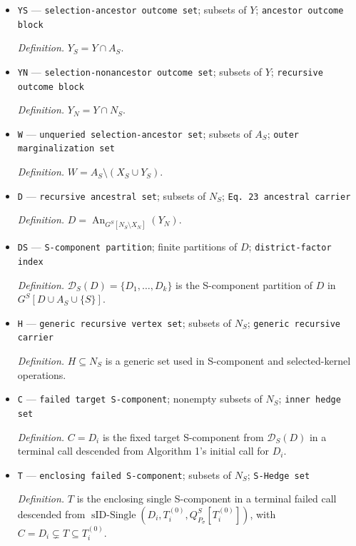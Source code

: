 \documentclass{article}
\begin{document}
\begin{itemize}
  \par\smallskip\noindent\emph{Definition.} \(x_N=x|_{X_N}\) is the restriction of the intervention value to \(X_N\).
  \item \texttt{YS} --- \texttt{selection-\allowbreak{}ancestor outcome set}; subsets of \(Y\); \texttt{ancestor outcome block}
  \par\smallskip\noindent\emph{Definition.} \(Y_S=Y\cap A_S\).
  \item \texttt{YN} --- \texttt{selection-\allowbreak{}nonancestor outcome set}; subsets of \(Y\); \texttt{recursive outcome block}
  \par\smallskip\noindent\emph{Definition.} \(Y_N=Y\cap N_S\).
  \item \texttt{W} --- \texttt{unqueried selection-\allowbreak{}ancestor set}; subsets of \(A_S\); \texttt{outer marginalization set}
  \par\smallskip\noindent\emph{Definition.} \(W=A_S\setminus(X_S\cup Y_S)\).
  \item \texttt{D} --- \texttt{recursive ancestral set}; subsets of \(N_S\); \texttt{Eq. 23 ancestral carrier}
  \par\smallskip\noindent\emph{Definition.} \(D=\operatorname{An}_{G^S[N_S\setminus X_N]}(Y_N)\).
  \item \texttt{DS} --- \texttt{S-\allowbreak{}component partition}; finite partitions of \(D\); \texttt{district-\allowbreak{}factor index}
  \par\smallskip\noindent\emph{Definition.} \(\mathcal D_S(D)=\{D_1,\ldots,D_k\}\) is the S-component partition of \(D\) in \(G^S[D\cup A_S\cup\{S\}]\).
  \item \texttt{H} --- \texttt{generic recursive vertex set}; subsets of \(N_S\); \texttt{generic recursive carrier}
  \par\smallskip\noindent\emph{Definition.} \(H\subseteq N_S\) is a generic set used in S-component and selected-kernel operations.
  \item \texttt{C} --- \texttt{failed target S-\allowbreak{}component}; nonempty subsets of \(N_S\); \texttt{inner hedge set}
  \par\smallskip\noindent\emph{Definition.} \(C=D_i\) is the fixed target S-component from \(\mathcal D_S(D)\) in a terminal call descended from Algorithm 1's initial call for \(D_i\).
  \item \texttt{T} --- \texttt{enclosing failed S-\allowbreak{}component}; subsets of \(N_S\); \texttt{S-\allowbreak{}Hedge set}
  \par\smallskip\noindent\emph{Definition.} \(T\) is the enclosing single S-component in a terminal failed call descended from \(\operatorname{sID\text{-}Single}(D_i,T_i^{(0)},Q_{P_\sigma}^S[T_i^{(0)}])\), with \(C=D_i\subsetneq T\subseteq T_i^{(0)}\).

\end{itemize}
\end{document}
